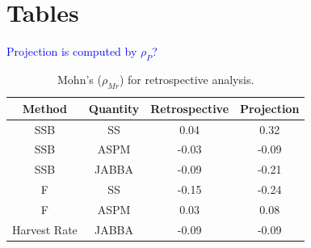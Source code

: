 \documentclass[12pt,halfline,a4paper,nonumbib]{ouparticle}
\newcommand{\toshi}{\textcolor{blue}}
\begin{document}
\clearpage
\newpage
\printbibliography

\section{Tables}

\toshi{Projection is computed by $\rho_P$?}

\begin{table}[!ht]
\caption{Mohn's ($\rho_{Mr}$) for retrospective analysis.}  
\begin{center}
\label{tab:retro-rho}
\begin{tabular}{|cccc|}
\hline
	\tiny Method	& {\tiny Quantity}  & {\tiny Retrospective} & {\tiny Projection} \\ 
\hline\hline
{\tiny SSB          } & {\tiny SS} 	     & {\tiny    0.04} & {\tiny  0.32}      \\
{\tiny SSB          } & {\tiny ASPM} 	 & {\tiny   -0.03} & {\tiny -0.09}      \\
{\tiny SSB          } & {\tiny JABBA} 	 & {\tiny   -0.09} & {\tiny -0.21}      \\
{\tiny F            } & {\tiny SS} 	     & {\tiny   -0.15} & {\tiny -0.24}      \\
{\tiny F            } & {\tiny ASPM} 	 & {\tiny    0.03} & {\tiny  0.08}      \\
{\tiny Harvest Rate } & {\tiny JABBA} 	 & {\tiny   -0.09} & {\tiny -0.09}      \\
\hline
\end{tabular}
\end{center}
\end{table}
\end{document}
